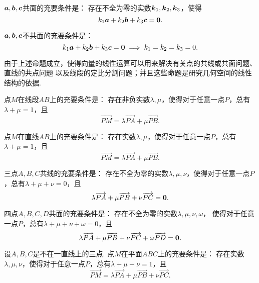 \begin{theorem}
\(\boldsymbol{a},\boldsymbol{b},\boldsymbol{c}\)共面的充要条件是：
存在不全为零的实数\(\boldsymbol{k}_1,\boldsymbol{k}_2,\boldsymbol{k}_3\)，使得\[
k_1 \boldsymbol{a} + k_2 \boldsymbol{b} + k_3 \boldsymbol{c} = \boldsymbol{0}.
\]
\end{theorem}

\begin{theorem}
\(\boldsymbol{a},\boldsymbol{b},\boldsymbol{c}\)不共面的充要条件是：\[
k_1 \boldsymbol{a} + k_2 \boldsymbol{b} + k_3 \boldsymbol{c} = \boldsymbol{0}
\implies
k_1 = k_2 = k_3 = 0.
\]
\end{theorem}

由于上述命题成立，使得向量的线性运算可以用来解决有关点的共线或共面问题、直线的共点问题
以及线段的定比分割问题；并且这些命题是研究几何空间的线性结构的依据.

\begin{theorem}
点\(M\)在线段\(AB\)上的充要条件是：
存在非负实数\(\lambda,\mu\)，使得对于任意一点\(P\)，总有\(\lambda+\mu=1\)，且\[
\vec{PM} = \lambda \vec{PA} + \mu \vec{PB}.
\]
\end{theorem}

\begin{theorem}
点\(M\)在直线\(AB\)上的充要条件是：
存在实数\(\lambda,\mu\)，使得对于任意一点\(P\)，总有\(\lambda+\mu=1\)，且\[
\vec{PM} = \lambda \vec{PA} + \mu \vec{PB}.
\]
\end{theorem}

\begin{theorem}
三点\(A,B,C\)共线的充要条件是：
存在不全为零的实数\(\lambda,\mu,\nu\)，使得对于任意一点\(P\)，总有\(\lambda+\mu+\nu=0\)，且\[
\lambda \overrightarrow{PA} + \mu \overrightarrow{PB} + \nu \overrightarrow{PC} = \boldsymbol{0}.
\]
\end{theorem}

\begin{theorem}
四点\(A,B,C,D\)共面的充要条件是：
存在不全为零的实数\(\lambda,\mu,\nu,\omega\)，
使得对于任意一点\(P\)，总有\(\lambda+\mu+\nu+\omega=0\)，且\[
\lambda \overrightarrow{PA} + \mu \overrightarrow{PB} + \nu \overrightarrow{PC} + \omega \overrightarrow{PD} = \boldsymbol{0}.
\]
\end{theorem}

\begin{theorem}
设\(A,B,C\)是不在一直线上的三点.
点\(M\)在平面\(ABC\)上的充要条件是：
存在实数\(\lambda,\mu,\nu\)，使得对于任意一点\(P\)，总有\(\lambda+\mu+\nu=1\)，且\[
\vec{PM} = \lambda \vec{PA} + \mu \vec{PB} + \nu \vec{PC}.
\]
\end{theorem}


